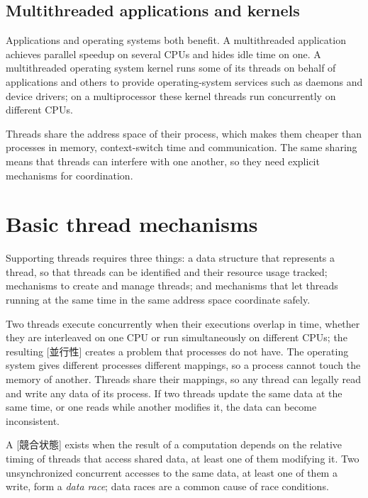 \documentclass[../main.tex]{subfiles}
\begin{document}
\subsection{Multithreaded applications and kernels}

Applications and operating systems both benefit.  A multithreaded
application achieves parallel speedup on several CPUs and hides idle time on one.  A multithreaded
operating system kernel runs some of its threads on behalf of applications
and others to provide operating-system services such as daemons and device
drivers; on a multiprocessor these kernel threads run concurrently on
different CPUs.

\begin{keypoint}
  Threads share the address space of their process, which makes them
  cheaper than processes in memory, context-switch time and communication.
  The same sharing means that threads can interfere with one another, so
  they need explicit mechanisms for coordination.
\end{keypoint}

\section{Basic thread mechanisms}
\label{sec:l03-mechanisms}

Supporting threads requires three things: a data structure that represents
a thread, so that threads can be identified and their resource usage
tracked; mechanisms to create and manage threads; and mechanisms that let
threads running at the same time in the same address space coordinate
safely.

Two threads execute concurrently when their executions overlap in time,
whether they are interleaved on one CPU or run simultaneously on different
CPUs; the resulting [並行性] creates a problem that
processes do not have.  The operating system gives different processes
different mappings, so a process cannot touch the memory of another.
Threads share their mappings, so any thread can legally read and write any
data of its process.  If two threads update the same data at the same time,
or one reads while another modifies it, the data can become inconsistent.

\begin{definition}
  A [競合状態] exists when the result of a computation
  depends on the relative timing of threads that access shared data, at
  least one of them modifying it.  Two unsynchronized concurrent accesses to
  the same data, at least one of them a write, form a \emph{data
  race}; data races are a
  common cause of race conditions.
\end{definition}
\end{document}
